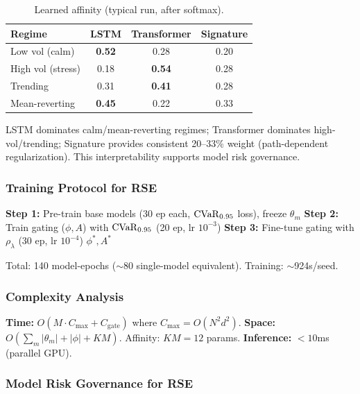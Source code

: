 \begin{table}[H]\centering\small
\caption{Learned affinity (typical run, after softmax).}
\begin{tabular}{lccc}\toprule
\textbf{Regime} & \textbf{LSTM} & \textbf{Transformer} & \textbf{Signature} \\\midrule
Low vol (calm) & \textbf{0.52} & 0.28 & 0.20 \\
High vol (stress) & 0.18 & \textbf{0.54} & 0.28 \\
Trending & 0.31 & \textbf{0.41} & 0.28 \\
Mean-reverting & \textbf{0.45} & 0.22 & 0.33 \\
\bottomrule
\end{tabular}
\end{table}

LSTM dominates calm/mean-reverting regimes; Transformer dominates high-vol/trending; Signature provides consistent 20--33\% weight (path-dependent regularization). This interpretability supports model risk governance.

\subsubsection{Training Protocol for RSE}

\begin{algorithm}[H]
\caption{RSE Training Protocol}
\begin{algorithmic}[1]
\STATE \textbf{Step 1:} Pre-train base models (30 ep each, $\mathrm{CVaR}_{0.95}$ loss), freeze $\theta_m$
\STATE \textbf{Step 2:} Train gating ($\phi, A$) with $\mathrm{CVaR}_{0.95}$ (20 ep, lr $10^{-3}$)
\STATE \textbf{Step 3:} Fine-tune gating with $\rho_\lambda$ (30 ep, lr $10^{-4}$)
\RETURN $\phi^*, A^*$
\end{algorithmic}
\end{algorithm}

Total: 140 model-epochs ($\sim$80 single-model equivalent). Training: $\sim$924s/seed.

\subsubsection{Complexity Analysis}

\textbf{Time:} $O(M \cdot C_{\max} + C_{\text{gate}})$ where $C_{\max} = O(N^2 d^2)$. \textbf{Space:} $O(\sum_m |\theta_m| + |\phi| + KM)$. Affinity: $KM = 12$ params. \textbf{Inference:} $<10$ms (parallel GPU).

\subsubsection{Model Risk Governance for RSE}

